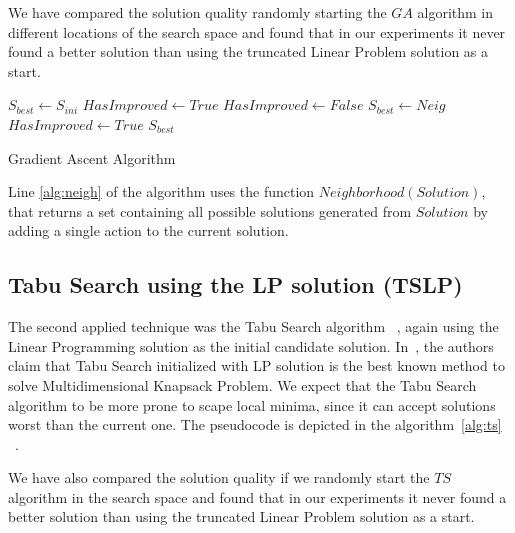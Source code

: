 We have compared the solution quality randomly starting the $GA$ algorithm in different locations of the
search space and found that in our experiments it never found a better solution
than using the truncated Linear Problem solution as a start.

\begin{algorithm}[H]
\begin{algorithmic}[1]
\State $S_{best} \gets S_{ini}$
\State $HasImproved \gets True$
    \State $HasImproved \gets False$
            \State $S_{best} \gets Neig$
            \State $HasImproved \gets True$
        \EndIf
    \EndFor
\EndWhile
\State \Return $S_{best}$
\EndFunction
\end{algorithmic}
\caption{Gradient Ascent Algorithm}
\label{alg:ga}
\end{algorithm}

Line \ref{alg:neigh} of the algorithm uses the function $Neighborhood(Solution)$, that
returns a set containing all possible solutions generated from $Solution$ by adding a
single action to the current solution.


\subsection{Tabu Search using the LP solution (TSLP)}

The second applied technique was the Tabu Search algorithm ~\cite{glover1997tabu}, again using the Linear Programming solution as the initial candidate solution. In~\cite{puchinger2010}, the authors claim that Tabu Search initialized with LP solution is the best known method to solve Multidimensional Knapsack Problem. We expect that the Tabu Search algorithm to be more prone to scape
local minima, since it can accept solutions worst than the current one. 
The pseudocode is depicted in the algorithm~\ref{alg:ts} ~\cite{brownlee2011clever}.

We have also compared the solution quality if we randomly start the $TS$ algorithm in the
search space and found that in our experiments it never found a better solution
than using the truncated Linear Problem solution as a start.

